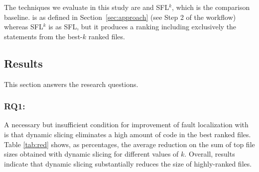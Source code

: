 \documentclass{article}
\begin{document}
The techniques we evaluate in this study are  and
SFL$^{k}$, which is the comparison baseline.  is as defined
in Section~\ref{sec:approach} (see Step 2 of the workflow) whereas
SFL$^{k}$ is as SFL, but it produces a ranking including exclusively
the statements from the best-$k$ ranked files.





\subsection{Results}

This section answers the research questions.







\subsubsection{\label{rq:1}RQ1: \textit{\rqone}}

A necessary but insufficient condition for improvement of fault
localization with \comb{} is that dynamic slicing eliminates a high
amount of code in the best ranked files. Table \ref{tab:red} shows, as
percentages, the average reduction on the sum of top file sizes
obtained with dynamic slicing for different values of
$k$. Overall, results indicate
that dynamic slicing substantially reduces the size of highly-ranked
files. 
\end{document}
